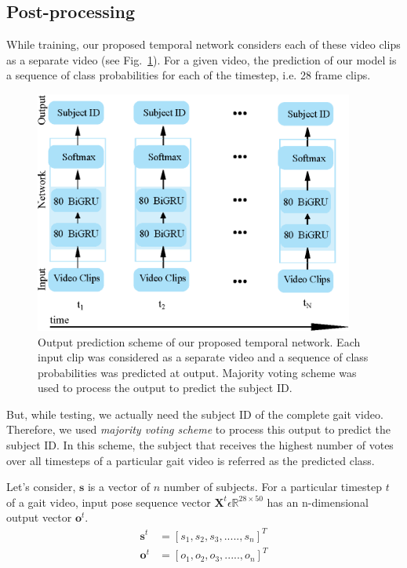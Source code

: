 \subsection{Post-processing}\label{sec_3.1.8}
While training, our proposed temporal network considers each of these video clips as a separate video (see Fig.~\ref{fig:output_prediction}). For a given video, the prediction of our model is a sequence of class probabilities for each of the timestep, i.e. 28 frame clips.
\begin{figure}
	\centering
	\includegraphics[width = 105mm]{figures/output_prediction.eps}
	\caption{
		Output prediction scheme of our proposed temporal network. Each input clip was considered as a separate video and a sequence of class probabilities was predicted at output. Majority voting scheme was used to process the output to predict the subject ID.
	}
	\label{fig:output_prediction}
\end{figure}

But, while testing, we actually need the subject ID of the complete gait video. Therefore, we used {\textit {majority voting scheme}} to process this output to predict the subject ID. In this scheme, the subject that receives the highest number of votes over all timesteps of a particular gait video is referred as the predicted class.

Let\rq s consider, $\boldsymbol{s}$ is a vector of $n$ number of subjects. For a particular timestep $t$ of a gait video, input pose sequence vector $\boldsymbol X^t \epsilon \mathbb {R}^{28\times 50}$ has an n-dimensional output vector $\boldsymbol o^t$.
\begin{equation}
\begin{split}
\boldsymbol s^t &=  {[s_1, s_2, s_3, ....., s_{n}]}^{T}\\
\boldsymbol o^t &=  {[o_1, o_2, o_3, ....., o_{n}]}^{T}
\label{equ:equ_5}
\end{split}
\end{equation}


